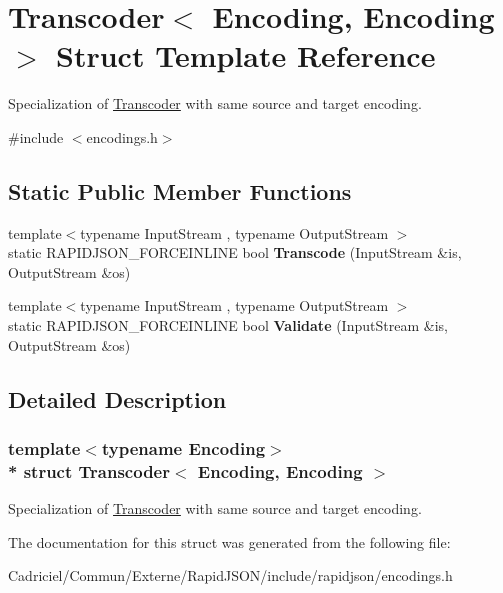 \hypertarget{struct_transcoder_3_01_encoding_00_01_encoding_01_4}{}\section{Transcoder$<$ Encoding, Encoding $>$ Struct Template Reference}
\label{struct_transcoder_3_01_encoding_00_01_encoding_01_4}


Specialization of \hyperlink{struct_transcoder}{Transcoder} with same source and target encoding.  




{\ttfamily \#include $<$encodings.\+h$>$}

\subsection*{Static Public Member Functions}
\begin{DoxyCompactItemize}
\item 
{\footnotesize template$<$typename Input\+Stream , typename Output\+Stream $>$ }\\static R\+A\+P\+I\+D\+J\+S\+O\+N\+\_\+\+F\+O\+R\+C\+E\+I\+N\+L\+I\+NE bool {\bfseries Transcode} (Input\+Stream \&is, Output\+Stream \&os)\hypertarget{struct_transcoder_3_01_encoding_00_01_encoding_01_4_aad11cdc2b829123a7b9969e34d456813}{}\label{struct_transcoder_3_01_encoding_00_01_encoding_01_4_aad11cdc2b829123a7b9969e34d456813}

\item 
{\footnotesize template$<$typename Input\+Stream , typename Output\+Stream $>$ }\\static R\+A\+P\+I\+D\+J\+S\+O\+N\+\_\+\+F\+O\+R\+C\+E\+I\+N\+L\+I\+NE bool {\bfseries Validate} (Input\+Stream \&is, Output\+Stream \&os)\hypertarget{struct_transcoder_3_01_encoding_00_01_encoding_01_4_a536aa3930251161d05e112947ec2f9c8}{}\label{struct_transcoder_3_01_encoding_00_01_encoding_01_4_a536aa3930251161d05e112947ec2f9c8}

\end{DoxyCompactItemize}


\subsection{Detailed Description}
\subsubsection*{template$<$typename Encoding$>$\\*
struct Transcoder$<$ Encoding, Encoding $>$}

Specialization of \hyperlink{struct_transcoder}{Transcoder} with same source and target encoding. 

The documentation for this struct was generated from the following file\+:\begin{DoxyCompactItemize}
\item 
Cadriciel/\+Commun/\+Externe/\+Rapid\+J\+S\+O\+N/include/rapidjson/encodings.\+h\end{DoxyCompactItemize}
